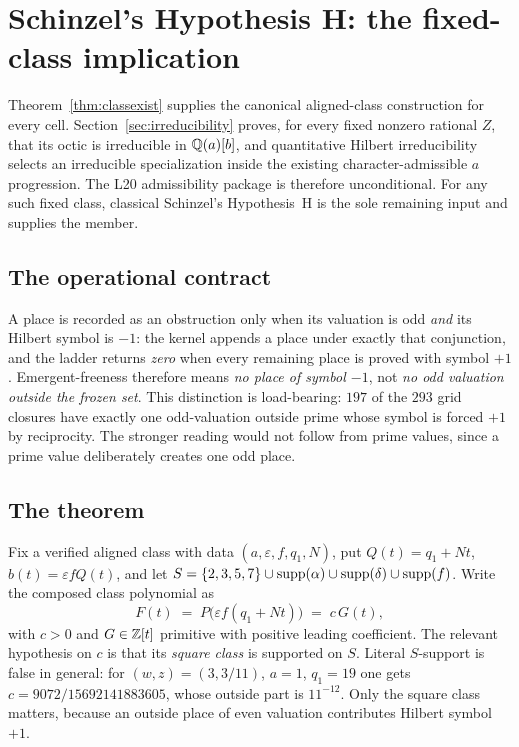 \section{Schinzel's Hypothesis H: the fixed-class implication}
\label{sec:schinzel}

Theorem~\ref{thm:classexist} supplies the canonical aligned-class
construction for every cell.  Section~\ref{sec:irreducibility} proves, for
every fixed nonzero rational $Z$, that its octic is irreducible in
$\mathbb{Q}(a)[b]$, and quantitative Hilbert irreducibility selects an irreducible
specialization inside the existing character-admissible $a$ progression.
The L20 admissibility package is therefore unconditional.  For any such
fixed class, classical Schinzel's Hypothesis~H \cite{schinzel} is the sole
remaining input and supplies the member.

\subsection{The operational contract}

A place is recorded as an obstruction only when its valuation is odd
\emph{and} its Hilbert symbol is $-1$: the kernel appends a place under
exactly that conjunction, and the ladder returns \emph{zero} when every
remaining place is proved with symbol $+1$.
Emergent-freeness therefore means \emph{no place of symbol $-1$}, not
\emph{no odd valuation outside the frozen set}. This distinction is
load-bearing: $197$ of the $293$ grid closures have exactly one
odd-valuation outside prime whose symbol is forced $+1$ by reciprocity.
The stronger reading would not follow from prime values, since a prime
value deliberately creates one odd place.

\subsection{The theorem}

Fix a verified aligned class with data $(a,\varepsilon,f,q_1,N)$, put
$Q(t) = q_1 + Nt$, $b(t) = \varepsilon f Q(t)$, and let
$S = \{2,3,5,7\} \cup \operatorname{supp}(\alpha) \cup \operatorname{supp}(\delta) \cup \operatorname{supp}(f)$.
Write the composed class polynomial as
\[
   F(t) \;=\; P\bigl(\varepsilon f (q_1 + Nt)\bigr) \;=\; c\,G(t),
\]
with $c > 0$ and $G \in \mathbb{Z}[t]$ primitive with positive leading
coefficient. The relevant hypothesis on $c$ is that its \emph{square
class} is supported on $S$. Literal $S$-support is false in general: for
$(w,z) = (3, 3/11)$, $a = 1$, $q_1 = 19$ one gets
$c = 9072/15692141883605$, whose outside part is $11^{-12}$. Only the
square class matters, because an outside place of even valuation
contributes Hilbert symbol $+1$.

